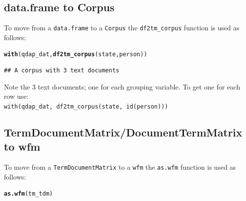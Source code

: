 \documentclass{article}\usepackage[]{graphicx}\usepackage[]{color}
\makeatletter
\newcommand{\hlstd}[1]{\textcolor[rgb]{0.345,0.345,0.345}{#1}}%
\newcommand{\hlkwd}[1]{\textcolor[rgb]{0.737,0.353,0.396}{\textbf{#1}}}%
\newenvironment{kframe}{%
 \def\at@end@of@kframe{}%
 \ifinner\ifhmode%
  \def\at@end@of@kframe{\end{minipage}}%
  \begin{minipage}{\columnwidth}%
 \fi\fi%
 \def\FrameCommand##1{\hskip\@totalleftmargin \hskip-\fboxsep
 \colorbox{shadecolor}{##1}\hskip-\fboxsep
     \hskip-\linewidth \hskip-\@totalleftmargin \hskip\columnwidth}%
 \MakeFramed {\advance\hsize-\width
   \@totalleftmargin\z@ \linewidth\hsize
   \@setminipage}}%
 {\par\unskip\endMakeFramed%
 \at@end@of@kframe}
\newenvironment{knitrout}{}{} %
\makeatother
\begin{document}
\subsection{data.frame to Corpus}

\hspace{.4cm} To move from a \texttt{data.frame} to a \texttt{Corpus} the \texttt{df2tm\_corpus} function is used as follows:

\begin{knitrout}
\color{fgcolor}\begin{kframe}
\begin{alltt}
\hlkwd{with}\hlstd{(qdap_dat,} \hlkwd{df2tm_corpus}\hlstd{(state, person))}
\end{alltt}
\end{kframe}
\end{knitrout}


\begin{knitrout}
\color{fgcolor}\begin{kframe}
\begin{verbatim}
## A corpus with 3 text documents
\end{verbatim}
\end{kframe}
\end{knitrout}


\scriptsize\noindent *Note the 3 text documents; one for each grouping variable.  To get one for each row use: \\ \indent \texttt{with(qdap\_dat, df2tm\_corpus(state, id(person)))} \normalsize

\subsection{TermDocumentMatrix/DocumentTermMatrix to wfm}

\hspace{.4cm} To move from a \texttt{TermDocumentMatrix} to a \texttt{wfm} the \texttt{as.wfm} function is used as follows:

\begin{knitrout}
\color{fgcolor}\begin{kframe}
\begin{alltt}
\hlkwd{as.wfm}\hlstd{(tm_tdm)}
\end{alltt}
\end{kframe}
\end{knitrout}
\end{document}

